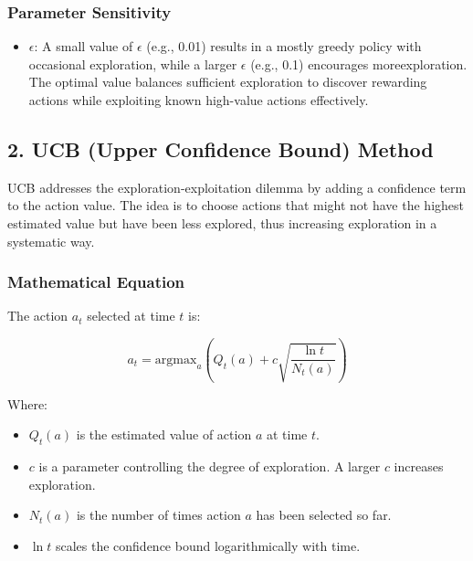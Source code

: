 \documentclass[
  letterpaper,
]{krantz}
\providecommand{\tightlist}{%
  \setlength{\itemsep}{0pt}\setlength{\parskip}{0pt}}\usepackage{longtable,booktabs,array}
\theoremstyle{plain}
\theoremstyle{definition}
\theoremstyle{definition}
\theoremstyle{remark}
\begin{document}
\subsubsection{Parameter Sensitivity}\label{parameter-sensitivity}

\begin{itemize}
\tightlist
\item
  \textbf{\(\epsilon\)}: A small value of \(\epsilon\) (e.g., 0.01)
  results in a mostly greedy policy with occasional exploration, while a
  larger \(\epsilon\) (e.g., 0.1) encourages moreexploration. The
  optimal value balances sufficient exploration to discover rewarding
  actions while exploiting known high-value actions effectively.
\end{itemize}

\subsection{2. UCB (Upper Confidence Bound)
Method}\label{ucb-upper-confidence-bound-method}

UCB addresses the exploration-exploitation dilemma by adding a
confidence term to the action value. The idea is to choose actions that
might not have the highest estimated value but have been less explored,
thus increasing exploration in a systematic way.

\subsubsection{Mathematical Equation}\label{mathematical-equation}

The action \(a_t\) selected at time \(t\) is:

\[a_t = \text{argmax}_a 
    \left(
        Q_t(a) + c \sqrt{\frac{\ln t}{N_t(a)}} \right)
\]

Where:

\begin{itemize}
\tightlist
\item
  \(Q_t(a)\) is the estimated value of action \(a\) at time \(t\).
\item
  \(c\) is a parameter controlling the degree of exploration. A larger
  \(c\) increases exploration.
\item
  \(N_t(a)\) is the number of times action \(a\) has been selected so
  far.
\item
  \(\ln t\) scales the confidence bound logarithmically with time.
\end{itemize}
\end{document}
